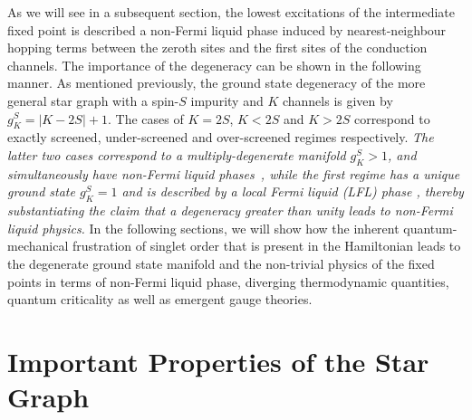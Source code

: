 \documentclass[reprint,prb,superscriptaddress]{revtex4-2}
\begin{document}
As we will see in a subsequent section, the lowest excitations of the intermediate fixed point is described a non-Fermi liquid phase induced by nearest-neighbour hopping terms between the zeroth sites and the first sites of the conduction channels. The importance of the degeneracy can be shown in the following manner. As mentioned previously, the ground state degeneracy of the more general star graph with a spin-\(S\) impurity and \(K\) channels is given by \(g^S_K = |K - 2S|+1\). The cases of \(K=2S\), \(K<2S\) and \(K>2S\) correspond to exactly screened, under-screened and over-screened regimes respectively. \textit{The latter two cases correspond to a multiply-degenerate manifold \(g^S_K > 1\), and simultaneously have non-Fermi liquid phases~\cite{Noz_blandin_1980,Gan_Andrei_Coleman_1993,emery_kivelson,Gan_mchannel_1994,Tsvelick_Weigmann_mchannel_1984,Tsvelick_weigmann_mchannel_1985,parcollet_olivier_large_N,kimura_taro_Su_N_kondo,PhysRevB.73.224445,cox_jarrell_two_channel_rev,affleck_1991_overscreen,Coleman_tsvelik,affleck1993exact,coleman_pepin_2003,roch_nicolas_costi_2009,schiller_avraham_2008,Durganandini_2011}, while the first regime has a unique ground state \(g^S_K = 1\) and is described by a local Fermi liquid (LFL) phase \cite{wilson1975,nozieres1974fermi,Noz_blandin_1980,andreiKondoreview,tsvelickKondoreview}, thereby substantiating the claim that a degeneracy greater than unity leads to non-Fermi liquid physics.} In the following sections, we will show how the inherent quantum-mechanical frustration of singlet order that is present in the Hamiltonian leads to the degenerate ground state manifold and the non-trivial physics of the fixed points in terms of non-Fermi liquid phase, diverging thermodynamic quantities, quantum criticality as well as emergent gauge theories.

\section{Important Properties of the Star Graph}
\end{document}

